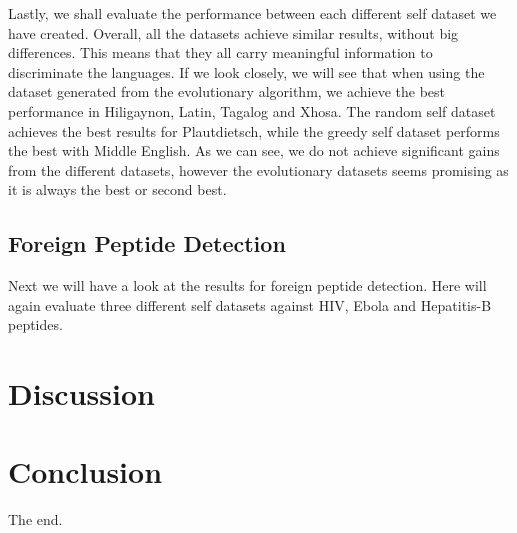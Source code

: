 \documentclass{article}
\begin{document}
Lastly, we shall evaluate the performance between each different self dataset we have created. Overall, all the datasets 
achieve similar results, without big differences. This means that they all carry meaningful information to 
discriminate the languages. If we look closely, we will see that when using the dataset generated from the evolutionary 
algorithm, we achieve the best performance in Hiligaynon, Latin, Tagalog and Xhosa. The random self dataset achieves the 
best results for Plautdietsch, while the greedy self dataset performs the best with Middle English. As we can see, we 
do not achieve significant gains from the different datasets, however the evolutionary datasets seems promising as it is 
always the best or second best.


\subsection{Foreign Peptide Detection}
Next we will have a look at the results for foreign peptide detection. Here will again evaluate three different self 
datasets against HIV, Ebola and Hepatitis-B peptides. 



\section{Discussion}



\section{Conclusion}

The end.

\printbibliography

\appendix
\end{document}

